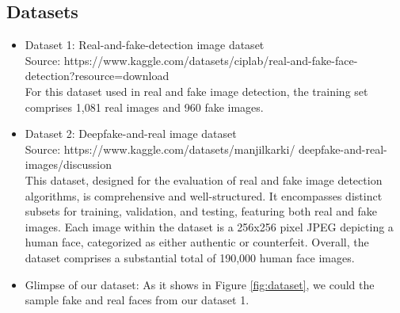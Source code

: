 \documentclass[rebuttal]{cvpr}
\begin{document}
\subsection{Datasets}
\begin{itemize}
    \item Dataset 1: Real-and-fake-detection image dataset  \\
    Source: https://www.kaggle.com/datasets/ciplab/real-and-fake-face-detection?resource=download \\
    For this dataset used in real and fake image detection, the training set comprises 1,081 real images and 960 fake images.
    \item Dataset 2: Deepfake-and-real image dataset  \\
    Source: https://www.kaggle.com/datasets/manjilkarki/
    deepfake-and-real-images/discussion \\
    This dataset, designed for the evaluation of real and fake image detection algorithms, is comprehensive and well-structured. It encompasses distinct subsets for training, validation, and testing, featuring both real and fake images. Each image within the dataset is a 256x256 pixel JPEG depicting a human face, categorized as either authentic or counterfeit. Overall, the dataset comprises a substantial total of 190,000 human face images.

    \item Glimpse of our dataset: As it shows in Figure \ref{fig:dataset}, we could the sample fake and real faces from our dataset 1.
    

\end{itemize}
\end{document}
